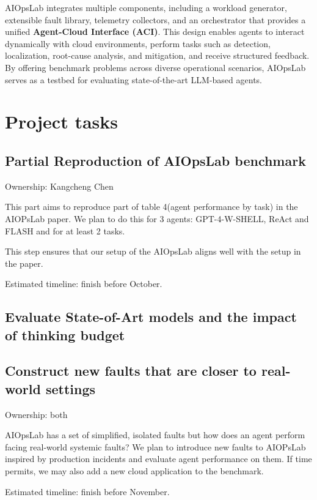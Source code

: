 \documentclass[conference]{IEEEtran}
\begin{document}
AIOpsLab integrates multiple components, including a workload generator, extensible fault library, telemetry collectors, and an orchestrator that provides a unified \textbf{Agent-Cloud Interface (ACI)}. This design enables agents to interact dynamically with cloud environments, perform tasks such as detection, localization, root-cause analysis, and mitigation, and receive structured feedback. By offering benchmark problems across diverse operational scenarios, AIOpsLab serves as a testbed for evaluating state-of-the-art LLM-based agents.

\section{Project tasks}
\subsection{Partial Reproduction of AIOpsLab benchmark}
Ownership: Kangcheng Chen

This part aims to reproduce part of table 4(agent performance by task) in the AIOPsLab paper. We plan to do this for 3 agents: GPT-4-W-SHELL, ReAct and FLASH and for at least 2 tasks.

This step ensures that our setup of the AIOpsLab aligns well with the setup in the paper.

Estimated timeline: finish before October. 
\subsection{Evaluate State-of-Art models and the impact of thinking budget}
\subsection{Construct new faults that are closer to real-world settings}
Ownership: both 

AIOpsLab has a set of simplified, isolated faults but how does an agent perform facing real-world systemic faults? We plan to introduce new faults to AIOPsLab inspired by production incidents and evaluate agent performance on them. If time permits, we may also add a new cloud application to the benchmark.

Estimated timeline: finish before November. 





\vspace{12pt}
\end{document}
